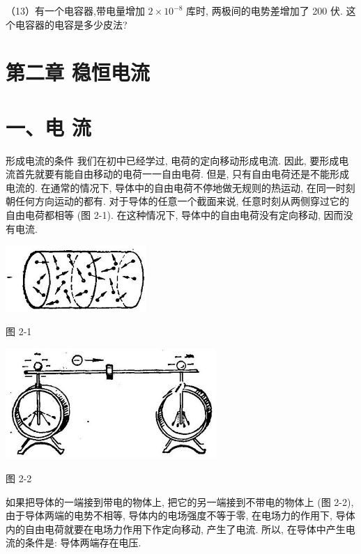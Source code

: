 \documentclass[10pt]{article}
\begin{document}
（13）有一个电容器,带电量增加 \(2 \times {10}^{-8}\) 库时, 两极间的电势差增加了 200 伏. 这个电容器的电容是多少皮法?

\section*{第二章 稳恒电流}

\section*{一、电 流}

形成电流的条件 我们在初中已经学过, 电荷的定向移动形成电流. 因此, 要形成电流首先就要有能自由移动的电荷一一自由电荷. 但是, 只有自由电荷还是不能形成电流的. 在通常的情况下, 导体中的自由电荷不停地做无规则的热运动, 在同一时刻朝任何方向运动的都有. 对于导体的任意一个截面来说, 任意时刻从两侧穿过它的自由电荷都相等 (图 2-1). 在这种情况下, 导体中的自由电荷没有定向移动, 因而没有电流.

\begin{center}
\includegraphics[max width=0.4\textwidth]{images/01913056-1f15-74d8-9184-9aab52c9d66b_59_514434.jpg}
\end{center}

图 2-1

\begin{center}
\includegraphics[max width=0.6\textwidth]{images/01913056-1f15-74d8-9184-9aab52c9d66b_59_105803.jpg}
\end{center}

图 2-2

如果把导体的一端接到带电的物体上, 把它的另一端接到不带电的物体上 (图 2-2), 由于导体两端的电势不相等, 导体内的电场强度不等于零, 在电场力的作用下, 导体内的自由电荷就要在电场力作用下作定向移动, 产生了电流. 所以, 在导体中产生电流的条件是: 导体两端存在电压.
\end{document}

